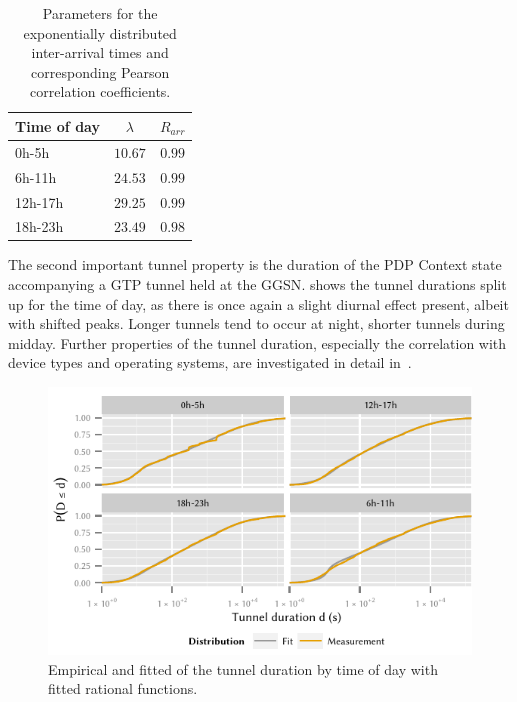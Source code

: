 \begin{table}
  \centering
  \caption{Parameters for the exponentially distributed inter-arrival times and corresponding Pearson correlation coefficients.}
  \label{tab:cloud:virtualized_network_functions:measurement_data:evaluation:iat_fits}  
  \begin{tabular}{lcc}
  \toprule
  Time of day & \(\lambda\) & \(R_{arr}\)\\
  \midrule
  0h-5h & $10.67$ & $0.99$\\
  6h-11h & $24.53$ & $0.99$\\
  12h-17h & $29.25$ & $0.99$\\
  18h-23h & $23.49$ & $0.98$\\
   \bottomrule
  \end{tabular}
\end{table}

The second important tunnel property is the duration of the \gls{PDP} Context state accompanying a \gls{GTP} tunnel held at the \gls{GGSN}.
 shows the tunnel durations split up for the time of day, as there is once again a slight diurnal effect present, albeit with shifted peaks.
Longer tunnels tend to occur at night, shorter tunnels during midday.
Further properties of the tunnel duration, especially the correlation with device types and operating systems, are investigated in detail in~\cite{Metzger2014}.

\begin{figure}
  \centering
  \includegraphics{cloud/virtualized_network_functions/measurement_data/figures/tunnel_duration}
  \caption{Empirical and fitted  of the tunnel duration by time of day with fitted rational functions.}
  \label{fig:cloud:virtualized_network_functions:measurement_data:evaluation:tunnel_duration}
\end{figure}

